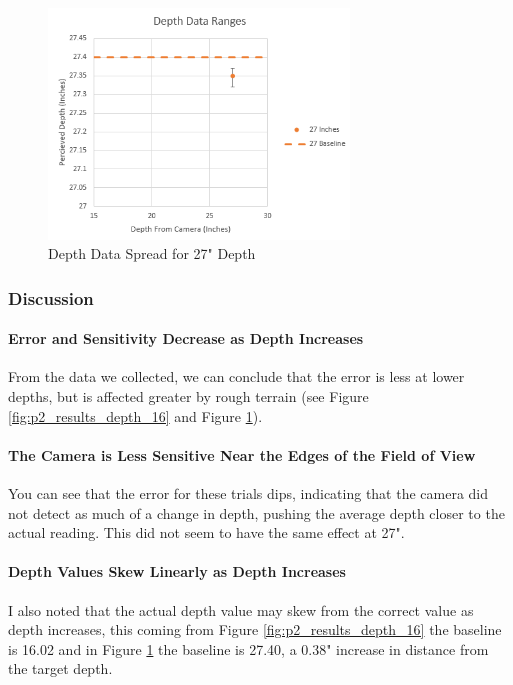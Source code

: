 \documentclass{article}
\begin{document}
			\begin{figure}[h]
				\includegraphics[width=8cm]{./images/part_2/error_range_27.png}
				\centering
				\caption{Depth Data Spread for 27" Depth}
				\label{fig:p2_results_depth_27}
			\end{figure}
		
		
		\newpage
		\subsubsection{Discussion}
			\paragraph{Error and Sensitivity Decrease as Depth Increases}
			From the data we collected, we can conclude that the error is less at lower depths, but is affected greater by rough terrain (see Figure \ref{fig:p2_results_depth_16} and Figure \ref{fig:p2_results_depth_27}).
			
			\paragraph{The Camera is Less Sensitive Near the Edges of the Field of View}
			You can see that the error for these trials dips, indicating that the camera did not detect as much of a change in depth, pushing the average depth closer to the actual reading. This did not seem to have the same effect at 27".
			
			\paragraph{Depth Values Skew Linearly as Depth Increases}
			I also noted that the actual depth value may skew from the correct value as depth increases, this coming from Figure \ref{fig:p2_results_depth_16} the baseline is 16.02 and in Figure \ref{fig:p2_results_depth_27} the baseline is 27.40, a 0.38" increase in distance from the target depth.

	\newpage

	\listoffigures
\end{document}
